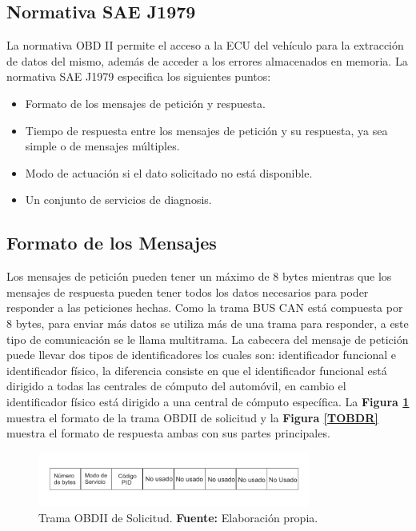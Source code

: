 \subsection{Normativa SAE J1979}

La normativa OBD II permite el acceso a la ECU del vehículo para la extracción de datos del mismo, además de acceder a los errores almacenados en memoria.
La normativa SAE J1979 especifica los siguientes puntos:
\begin{itemize}
\item Formato de los mensajes de petición y respuesta.
\item Tiempo de respuesta entre los mensajes de petición y su respuesta, ya sea simple o de mensajes múltiples.
\item Modo de actuación si el dato solicitado no está disponible.
\item Un conjunto de servicios de diagnosis.
\end{itemize}

\subsection{Formato de los Mensajes}

Los mensajes de petición pueden tener un máximo de 8 bytes mientras que los mensajes de respuesta pueden tener todos los datos necesarios para poder responder a las peticiones hechas.
Como la trama BUS CAN está compuesta por 8 bytes, para enviar más datos se utiliza más de una trama para responder, a este tipo de comunicación se le llama multitrama.
La cabecera del mensaje de petición puede llevar dos tipos de identificadores los cuales son: identificador funcional e identificador físico, la diferencia consiste en que el identificador funcional está dirigido a todas las centrales de cómputo del automóvil, en cambio el identificador físico está dirigido a una central de cómputo específica.
La \textbf{Figura \ref{TOBD}} muestra el formato de la trama OBDII de solicitud y la \textbf{Figura \ref{TOBDR}} muestra el formato de respuesta ambas con sus partes principales.

\begin{figure}[H]
	\centering
		\includegraphics[width=0.8\textwidth]{./Cap3imagen/TramaOBDIIpregunta.pdf}
	\caption[Trama OBDII.]{Trama OBDII de Solicitud.\textbf{ Fuente:} Elaboración propia.}
	\label{TOBD} %
\end{figure}

